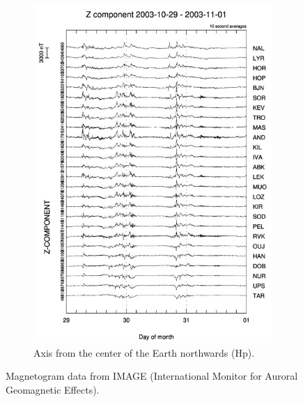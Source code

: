 \begin{figure}[H]
\begin{subfigure}[b]{0.33\textwidth}
                \includegraphics[width=\linewidth]{figures/IMAGE_Z_gram.jpg}
                \caption{Axis from the center of the Earth northwards (Hp)\cite{image}.}
				\label{fig:image_z_gram}
        \end{subfigure}
        \caption{Magnetogram data from IMAGE (International Monitor for Auroral Geomagnetic Effects).}
        \label{fig:image_grams}
\end{figure}



